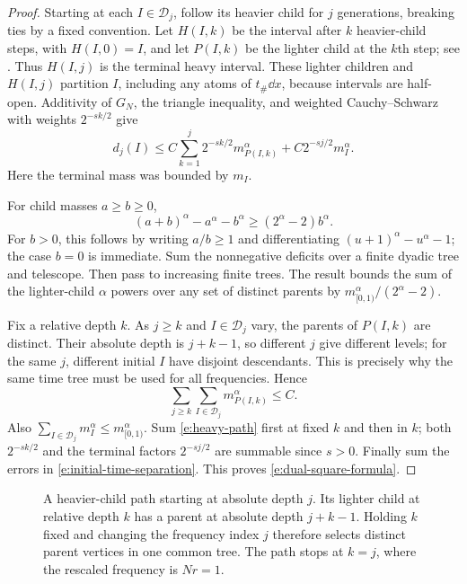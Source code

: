 \begin{proof}
Starting at each $I\in\mathcal D_j$, follow its heavier child for $j$
generations, breaking ties by a fixed convention. Let $H(I,k)$ be
the interval after $k$ heavier-child steps, with $H(I,0)=I$, and
let $P(I,k)$ be the lighter child at the $k$th step; see
. Thus $H(I,j)$ is the terminal heavy interval.
These lighter children and $H(I,j)$ partition $I$,
including any atoms of $t_\#\dd x$, because intervals are half-open.
Additivity of $G_N$, the triangle inequality, and weighted
Cauchy--Schwarz with weights $2^{-sk/2}$ give
\begin{equation}
 d_j(I)\le C\sum_{k=1}^j2^{-sk/2}m_{P(I,k)}^\alpha
             +C2^{-sj/2}m_I^\alpha.
 \label{e:heavy-path}
\end{equation}
Here the terminal mass was bounded by $m_I$.

For child masses $a\ge b\ge0$,
\begin{equation}
 (a+b)^\alpha-a^\alpha-b^\alpha
       \ge(2^\alpha-2)b^\alpha.
 \label{e:convexity-deficit}
\end{equation}
For $b>0$, this follows by writing $a/b\ge1$ and differentiating
$(u+1)^\alpha-u^\alpha-1$; the case $b=0$ is immediate.  Sum the
nonnegative deficits over a finite dyadic tree and telescope.  Then
pass to increasing finite trees.  The result bounds the sum of the
lighter-child $\alpha$ powers over any set of distinct parents by
$m_{[0,1)}^\alpha/(2^\alpha-2)$.

Fix a relative depth $k$.  As $j\ge k$ and $I\in\mathcal D_j$ vary,
the parents of $P(I,k)$ are distinct.  Their absolute depth is
$j+k-1$, so different $j$ give different levels; for the same $j$,
different initial $I$ have disjoint descendants.  This is precisely
why the same time tree must be used for all frequencies.  Hence
\[
 \sum_{j\ge k}\sum_{I\in\mathcal D_j}m_{P(I,k)}^\alpha\le C.
\]
Also $\sum_{I\in\mathcal D_j}m_I^\alpha\le m_{[0,1)}^\alpha$.
Sum \eqref{e:heavy-path} first at fixed $k$ and then in $k$; both
$2^{-sk/2}$ and the terminal factors $2^{-sj/2}$ are summable since
$s>0$.  Finally sum the errors in \eqref{e:initial-time-separation}.
This proves \eqref{e:dual-square-formula}.
\end{proof}

\begin{figure}[htbp]
 \centering
 
 \caption{A heavier-child path starting at absolute depth $j$.  Its
 lighter child at relative depth $k$ has a parent at absolute depth
 $j+k-1$.  Holding $k$ fixed and changing the frequency index $j$
 therefore selects distinct parent vertices in one common tree.
 The path stops at $k=j$, where the rescaled frequency is $Nr=1$.}
 \label{e:time-tree-figure}
\end{figure}

